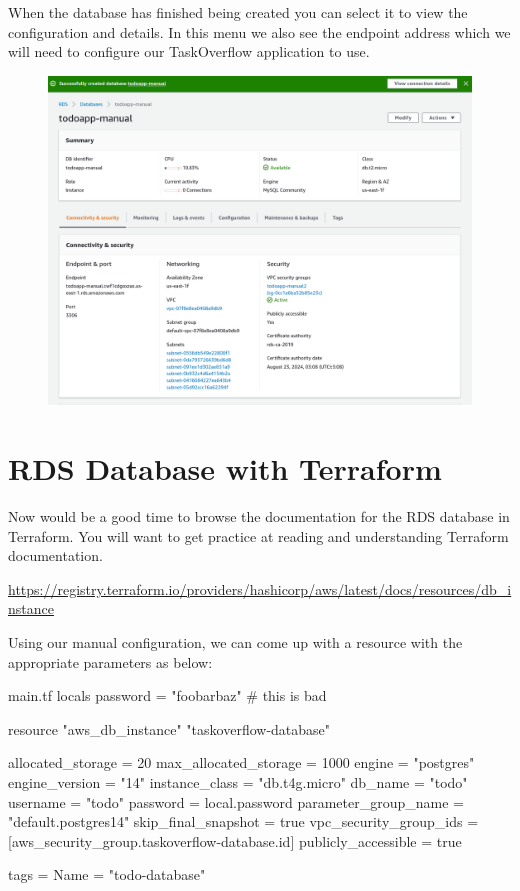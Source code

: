 \documentclass{csse4400}
\begin{document}
When the database has finished being created you can select it to view the configuration and details.
In this menu we also see the endpoint address which we will need to configure our TaskOverflow application to use.

\begin{figure}[H]
  \includegraphics[width=\textwidth]{images/aws_5}
\end{figure}

\section{RDS Database with Terraform}

Now would be a good time to browse the documentation for the RDS database in Terraform.
You will want to get practice at reading and understanding Terraform documentation.

\noindent \url{https://registry.terraform.io/providers/hashicorp/aws/latest/docs/resources/db_instance}

Using our manual configuration, we can come up with a resource with the appropriate parameters as below:

\begin{code}[language=terraform,numbers=none]{main.tf}
locals {
  password = "foobarbaz" # this is bad
}

resource "aws_db_instance" "taskoverflow-database" {
  allocated_storage      = 20
  max_allocated_storage  = 1000
  engine                 = "postgres"
  engine_version         = "14"
  instance_class         = "db.t4g.micro"
  db_name                = "todo"
  username               = "todo"
  password               = local.password
  parameter_group_name   = "default.postgres14"
  skip_final_snapshot    = true
  vpc_security_group_ids = [aws_security_group.taskoverflow-database.id]
  publicly_accessible    = true

  tags = {
    Name = "todo-database"
  }
}
\end{code}
\end{document}
